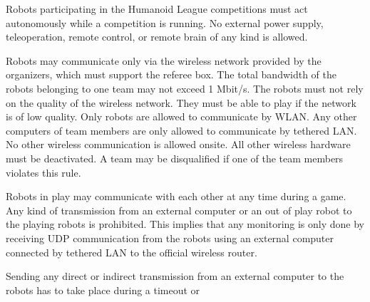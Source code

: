 \headlinebox

Robots participating in the Humanoid League competitions must act autonomously while a competition is running. No external power supply, teleoperation, remote control, or remote brain of any kind is allowed.

\bigskip

Robots may communicate only via the wireless network provided by the organizers, which must support the referee box. The total bandwidth of the robots belonging to one team may not exceed 1 Mbit/s. The robots must not rely on the quality of the wireless network. They
must be able to play if the network is of low quality. Only robots are allowed to communicate by WLAN. Any other computers of team members are only allowed to communicate by tethered LAN. No other wireless communication is allowed onsite. All other wireless hardware must be deactivated. A team may be disqualified if one of the team members violates this rule.

\bigskip

Robots in play may communicate with each other at any time during a game.  Any kind of transmission from an external computer or an out of play robot to the playing robots is prohibited. This implies that any monitoring is only done by receiving UDP communication from the robots using an external computer connected by tethered LAN to the official wireless router. 

\bigskip

Sending any direct or indirect transmission from an external computer to the robots has to take place during a timeout or  
\bigskip


